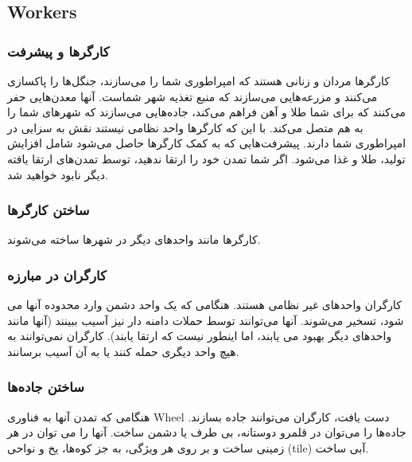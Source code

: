 \documentclass[]{article}
\begin{document}
\subsection*{{\titr Workers}}


\subsubsection*{{\titr کارگرها و پیشرفت}}
کارگرها مردان و زنانی هستند که امپراطوری شما را می‌سازند، جنگل‌ها را پاکسازی می‌کنند و مزرعه‌هایی می‌سازند که منبع تغذیه شهر شماست.
آنها معدن‌هایی حفر می‌کنند که برای شما طلا و آهن فراهم می‌کند، جاده‌‌هایی می‌سازند که شهرهای شما را به هم متصل می‌کند.
با این که کارگرها واحد نظامی نیستند نقش به سزایی در امپراطوری شما دارند.
پیشرفت‌هایی که به کمک کارگرها حاصل می‌شود شامل افزایش تولید، طلا و غذا می‌شود. اگر شما تمدن خود را ارتقا ندهید، توسط تمدن‌های ارتقا یافته دیگر نابود خواهید شد.

\subsubsection*{{\titr ساختن کارگرها}}
کارگرها مانند واحدهای دیگر در شهرها ساخته می‌شوند.

\subsubsection*{{\titr کارگران در مبارزه}}
کارگران واحدهای غیر نظامی هستند. هنگامی که یک واحد دشمن وارد محدوده آنها می شود، تسخیر می‌شوند.
آنها می‌توانند توسط حملات دامنه دار نیز آسیب ببینند (آنها مانند واحدهای دیگر بهبود می یابند، اما اینطور نیست که ارتقا یابند). کارگران نمی‌توانند به هیچ واحد دیگری حمله کنند یا به آن آسیب برسانند. 

\subsubsection*{{\titr ساختن جاده‌ها}}
هنگامی که تمدن آنها به فناوری Wheel دست یافت، کارگران می‌توانند جاده بسازند.
جاده‌ها را می‌توان در قلمرو دوستانه، بی طرف یا دشمن ساخت. آنها را می توان در هر زمینی ساخت و بر روی هر ویژگی، به جز کوه‌ها، یخ و نواحی (tile) آبی ساخت.
\end{document}
